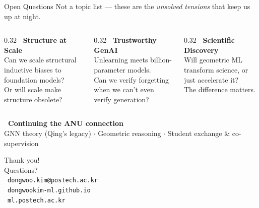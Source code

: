 \documentclass[aspectratio=169,11pt]{beamer}
\begin{document}
\begin{frame}{Open Questions}
  {\small Not a topic list --- these are the \textit{unsolved tensions} that keep us up at night.}
  \vspace{8pt}

  \begin{columns}[T]
    \begin{column}{0.32\textwidth}
      \centering
      \textbf{\faProjectDiagram~Structure at Scale}\\[6pt]
      {\small Can we scale structural inductive biases to foundation models?\\[4pt]
      Or will scale make structure obsolete?}
    \end{column}
    \begin{column}{0.32\textwidth}
      \centering
      \textbf{\faLock~Trustworthy GenAI}\\[6pt]
      {\small Unlearning meets billion-parameter models.\\[4pt]
      Can we verify forgetting when we can't even verify generation?}
    \end{column}
    \begin{column}{0.32\textwidth}
      \centering
      \textbf{\faAtom~Scientific Discovery}\\[6pt]
      {\small Will geometric ML transform science, or just accelerate it?\\[4pt]
      The difference matters.}
    \end{column}
  \end{columns}

  \vspace{14pt}
  \begin{center}
    \textbf{\faHandshake~Continuing the ANU connection}\\
    {\small GNN theory (Qing's legacy) $\cdot$ Geometric reasoning $\cdot$ Student exchange \& co-supervision}
  \end{center}
\end{frame}

\begin{frame}[standout]
  Thank you! \\[12pt]
  {\large Questions?} \\[20pt]
  {\small
    \faEnvelope~\texttt{dongwoo.kim@postech.ac.kr} \\[4pt]
    \faGlobe~\texttt{dongwookim-ml.github.io} \\[4pt]
    \faGraduationCap~\texttt{ml.postech.ac.kr}
  }
\end{frame}
\end{document}
